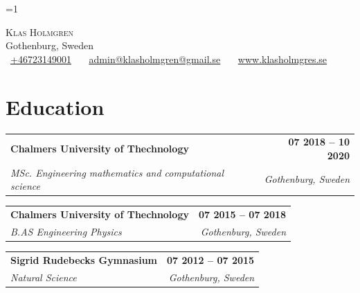 \documentclass[letterpaper,11pt]{article}
\makeatletter
\newcommand{\entry}[5][]{%
  \begin{tabular*}{\textwidth}[t]{@{}l@{\extracolsep{\fill}}r@{}}
    {\large\bfseries #2} & {\small\bfseries #3}\\
    {\large\itshape #1#4} & {\small\itshape #5}\\
  \end{tabular*}\par\vspace{1.6pt}}
\makeatother
\begin{document}
\vspace*{-20.8pt}
=1\par\vspace{-0.95pt}
\begin{center}
  {\Huge\scshape Klas Holmgren}\\[2pt]
  Gothenburg, Sweden\\
  \small\faPhone\ \underline{\href{tel:+46723149001}{+46723149001}}~~
  \faEnvelope\ \underline{\href{mailto:admin@klasholmgren@gmail.se}{admin@klasholmgren@gmail.se}}~~
  \faCircle\ \underline{\href{https://www.klasholmgres.se}{www.klasholmgres.se}}
\end{center}
\vspace{-11.6pt}

\section{Education}
\entry{Chalmers University of Thechnology}{07 2018 -- 10 2020}{MSc. Engineering mathematics and computational science}{Gothenburg, Sweden}\vspace{11.2pt}
\entry{Chalmers University of Thechnology}{07 2015 -- 07 2018}{B.AS Engineering Physics}{Gothenburg, Sweden}\vspace{11.2pt}
\entry{Sigrid Rudebecks Gymnasium}{07 2012 -- 07 2015}{Natural Science}{Gothenburg, Sweden}
\end{document}
